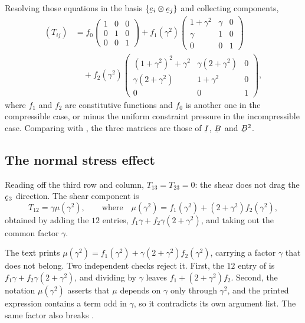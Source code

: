 Resolving those equations in the basis $\{\be_{i}\otimes\be_{j}\}$ and
collecting components,
\begin{equation}
\begin{aligned}
   (T_{ij})&=f_{0}\begin{pmatrix}1&0&0\\0&1&0\\0&0&1\end{pmatrix}
   +f_{1}(\gamma^{2})\begin{pmatrix}1+\gamma^{2}&\gamma&0\\
   \gamma&1&0\\0&0&1\end{pmatrix}\\[2pt]
   &\quad+f_{2}(\gamma^{2})\begin{pmatrix}
   (1+\gamma^{2})^{2}+\gamma^{2}&\gamma(2+\gamma^{2})&0\\
   \gamma(2+\gamma^{2})&1+\gamma^{2}&0\\ 0&0&1\end{pmatrix},
\end{aligned}
   \tag{11.39}\label{eq:11.39}
\end{equation}
where $f_{1}$ and $f_{2}$ are constitutive functions and $f_{0}$ is
another one in the compressible case, or minus the uniform constraint
pressure in the incompressible case. Comparing with , the
three matrices are those of $\I$, $\bB$ and $\bB^{2}$.

\subsection*{The normal stress effect}\label{sec:ch11normal}

Reading  off the third row and column, $T_{13}=T_{23}=0$:
the shear does not drag the $\be_{3}$ direction. The shear component is
\begin{equation}
   T_{12}=\gamma\mu(\gamma^{2}),\qquad\text{where}\quad
   \mu(\gamma^{2})=f_{1}(\gamma^{2})+(2+\gamma^{2})f_{2}(\gamma^{2}),
   \tag{11.40}\label{eq:11.40}
\end{equation}
obtained by adding the $12$ entries, $f_{1}\gamma+f_{2}\gamma(2+
\gamma^{2})$, and taking out the common factor $\gamma$.

\begin{remark}\label{rem:ch11mis40}
The text prints $\mu(\gamma^{2})=f_{1}(\gamma^{2})+\gamma(2+\gamma^{2})
f_{2}(\gamma^{2})$, carrying a factor $\gamma$ that does not belong.
Two independent checks reject it. First, the $12$ entry of 
is $f_{1}\gamma+f_{2}\gamma(2+\gamma^{2})$, and dividing by $\gamma$
leaves $f_{1}+(2+\gamma^{2})f_{2}$. Second, the notation
$\mu(\gamma^{2})$ asserts that $\mu$ depends on $\gamma$ only through
$\gamma^{2}$, and the printed expression contains a term odd in
$\gamma$, so it contradicts its own argument list. The same factor also
breaks .
\end{remark}

